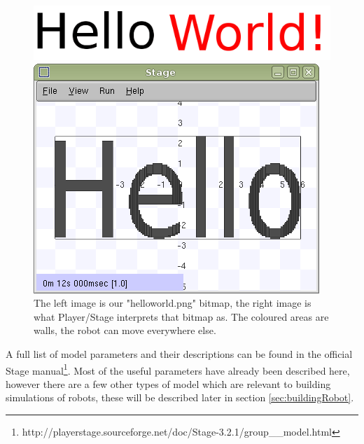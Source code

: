 \documentclass[a4paper]{report}
\newcommand{\plst}{Player/Stage\xspace}
\begin{document}
\begin{figure}
	\centering
	\begin{minipage}[c]{0.4\linewidth}
		\centering
		\includegraphics[width=\linewidth]{./pics/emptyWorld/writing.png}
		
	\end{minipage}%
	\hspace{0.05\linewidth}
	\begin{minipage}[c]{0.5\linewidth}
		\centering
		\includegraphics[width=\linewidth]{./revised_pics/empty_world/helloworld.png} 
	\end{minipage}	
	\caption{The left image is our "helloworld.png" bitmap, the right image is what \plst interprets that bitmap as. The coloured areas are walls, the robot can move everywhere else.}
		\label{fig:helloWorldBitmap}
\end{figure}

A full list of model parameters and their descriptions can be found in the official Stage manual\footnote{http://playerstage.sourceforge.net/doc/Stage-3.2.1/group\_\_model.html}. Most of the useful parameters have already been described here, however there are a few other types of model which are relevant to building simulations of robots, these will be described later in section \ref{sec:buildingRobot}.
\end{document}
